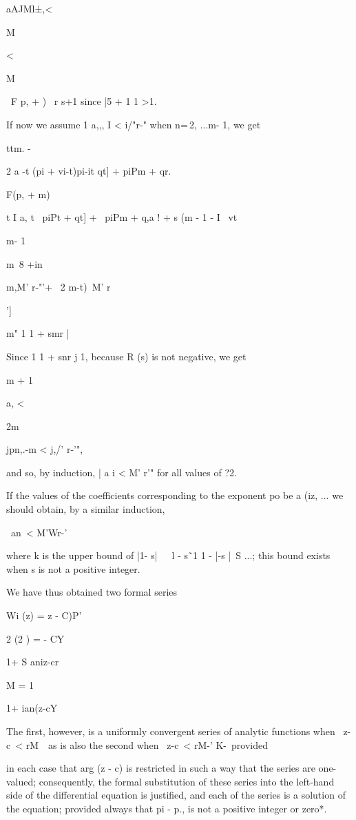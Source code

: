 aAJMl±,<

M

<

M

\ F p, + ) \ r s+1 since |5 + 1 1 >1.

If now we assume 1 a,,, I < i/"r-" when n=\,2, ...m- 1, we get

ttm. -

2 a -t (pi + vi-t)pi-it qt] + piPm + qr.

F(p, + m)

t I a, t \ piPt + qt] + \ piPm + q,a ! + s (m - 1 - I \ vt

m- 1

m\ 8 +in\

m,M' r-"'+ \ 2 m-t)\ M' r

']

m" 1 1 + smr |

Since 1 1 + snr j 1, because R (s) is not negative, we get

m + 1

a, <

2m

jpn,.-m < j,/' r-'",

and so, by induction, | a i < M' r'" for all values of ?2.

If the values of the coefficients corresponding to the exponent po be
a (iz, ... we should obtain, by a similar induction,

\ an\ < M'Wr-'\

where k is the upper bound of |1- s|~\ \ l - s\~\ 1 1 - |-s |~S ...;
this bound exists when s is not a positive integer.

We have thus obtained two formal series

Wi (z) = z - C)P'

 2 (2 ) = - CY

1+ S aniz-cr

M = 1

1+ ian(z-cY

The first, however, is a uniformly convergent series of analytic
functions when \ z-c\ < rM~\ as is also the second when \ z-c\ < rM-'
K-\ provided

%
%

in each case that arg (z - c) is restricted in such a way that the
series are one-valued; consequently, the formal substitution of these
series into the left-hand side of the differential equation is
justified, and each of the series is a solution of the equation;
provided always that pi - p., is not a positive integer or zero*.

